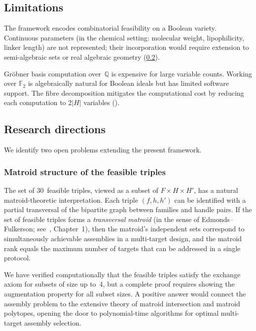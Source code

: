 \documentclass[preprint,12pt]{elsarticle}
\theoremstyle{definition}
\theoremstyle{remark}
\newcommand{\QQ}{\mathbb{Q}}
\begin{document}
\subsection{Limitations}

The framework encodes combinatorial feasibility on a Boolean
variety.  Continuous parameters (in the chemical setting:
molecular weight, lipophilicity, linker length) are not
represented; their incorporation would require extension to
semi-algebraic sets or real algebraic geometry
(\cref{sec:directions}).

Gr\"obner basis computation over~$\QQ$ is expensive for large
variable counts.  Working over $\mathbb{F}_2$ is algebraically
natural for Boolean ideals but has limited software support.
The fibre decomposition mitigates the computational cost by
reducing each computation to $2|H|$ variables
().


\subsection{Research directions}\label{sec:directions}

We identify two open problems extending the present framework.

\subsubsection{Matroid structure of the feasible triples}

The set of 30~feasible triples, viewed as a subset of
$F \times H \times H'$, has a natural matroid-theoretic
interpretation.  Each triple $(f, h, h')$ can be identified
with a partial transversal of the bipartite graph between
families and handle pairs.  If the set of feasible triples
forms a \emph{transversal matroid} (in the sense of Edmonds--Fulkerson;
see~\cite{Oxley11}, Chapter~1), then the matroid's independent
sets correspond to simultaneously achievable assemblies in a
multi-target design, and the matroid rank equals the maximum
number of targets that can be addressed in a single protocol.

We have verified computationally that the feasible triples
satisfy the exchange axiom for subsets of size up to~4,
but a complete proof requires showing the augmentation
property for all subset sizes.  A positive answer would
connect the assembly problem to the extensive theory of
matroid intersection and matroid polytopes, opening
the door to polynomial-time algorithms for optimal
multi-target assembly selection.
\end{document}
